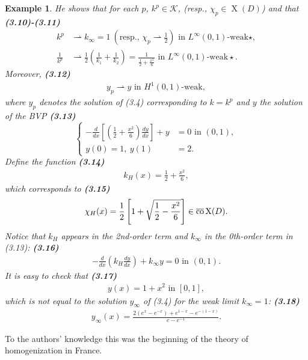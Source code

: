 \documentclass{book}
\numberwithin{equation}{section}
\newtheorem{example}{Example}[section]
\begin{document}
\begin{enumerate}
\begin{example}
        He shows that for each $p$, $k^p\in\mathcal{K}$, (resp., $\chi_p\in\operatorname{X}(D)$) and that \textbf{(3.10)-(3.11)}
        \begin{align*}
            k^p&\rightharpoonup k_\infty = 1\ \left(\mbox{resp., } \chi_p\rightharpoonup\frac{1}{2}\right) \mbox{ in } L^\infty(0,1)\mbox{-weak}\star,\\
            \frac{1}{k^p}&\rightharpoonup\frac{1}{2}\left(\frac{1}{k_1} + \frac{1}{k_2}\right) = \frac{1}{\frac{1}{2} + \frac{x^2}{6}} \mbox{ in } L^\infty(0,1)\mbox{-weak}\star.
        \end{align*}
        Moreover, \textbf{(3.12)}
        \begin{align*}
            y_p\rightharpoonup y \mbox{ in } H^1(0,1)\mbox{-weak},
        \end{align*}
        where $y_p$ denotes the solution of (3.4) corresponding to $k = k^p$ and $y$ the solution of the BVP \textbf{(3.13)}
        \begin{equation*}
            \left\{\begin{split}
                -\frac{d}{dx}\left[\left(\frac{1}{2} + \frac{x^2}{6}\right)\frac{dy}{dx}\right] + y &= 0 \mbox{ in } (0,1),\\
                y(0) = 1,\ y(1) &= 2.
            \end{split}\right.
        \end{equation*}
        Define the function \textbf{(3.14)}
        \begin{align*}
            k_H(x) = \frac{1}{2} + \frac{x^2}{6},
        \end{align*}
        which corresponds to \textbf{(3.15)}
        \begin{align*}
            \chi_H(x) = \frac{1}{2}\left[1 + \sqrt{\frac{1}{2} - \frac{x^2}{6}}\right]\in\overline{\rm co}\operatorname{X}(D).
        \end{align*}
        Notice that $k_H$ appears in the 2nd-order term and $k_\infty$ in the 0th-order term in (3.13): \textbf{(3.16)}
        \begin{align*}
            -\frac{d}{dx}\left(k_H\frac{dy}{dx}\right) + k_\infty y = 0 \mbox{ in } (0,1).
        \end{align*}
        It is easy to check that \textbf{(3.17)}
        \begin{align*}
            y(x) = 1 + x^2 \mbox{ in } [0,1],
        \end{align*}
        which is not equal to the solution $y_\infty$ of (3.4) for the weak limit $k_\infty = 1$: \textbf{(3.18)}
        \begin{align*}
            y_\infty(x) = \frac{2\left(e^x - e^{-x}\right) + e^{1 - x} - e^{-(1 - x)}}{e - e^{-1}}.
        \end{align*}
    \end{example}
    To the authors' knowledge this was the beginning of the theory of homogenization in France.
    

\end{enumerate}
\end{document}
